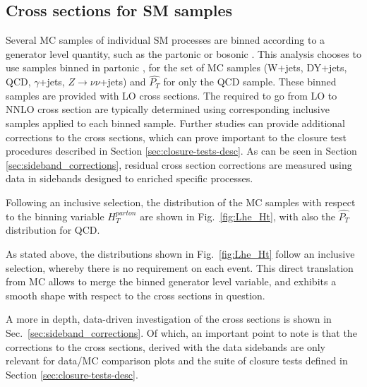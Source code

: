 \subsection{Cross sections for SM samples}
Several MC samples of individual SM processes are binned according to a generator level quantity, such as the partonic \HT or bosonic \PT.
This analysis chooses to use samples binned in partonic \HT, for the set of MC samples (W+jets, DY+jets, QCD, $\gamma$+jets, $Z\rightarrow \nu\nu$+jets) and $\hat{P_{T}}$
for only the QCD sample.
These binned samples are provided with LO cross sections. The \kfactors required to go from LO to NNLO cross section are typically determined using corresponding
inclusive samples applied to each \HT binned sample.
Further studies can provide additional corrections to the cross sections, which can prove important to the closure test procedures described in
Section \ref{sec:closure-tests-desc}. As can be seen in Section \ref{sec:sideband_corrections}, residual cross section
corrections are measured using data in sidebands designed to enriched specific processes.

Following an inclusive selection, the distribution of the MC samples with respect to the binning variable $H_{T}^{parton}$ are shown in Fig.~\ref{fig:Lhe_Ht}, with
also the $\hat{P_{T}}$ distribution for QCD.

As stated above, the distributions shown in Fig.~\ref{fig:Lhe_Ht} follow an inclusive selection, whereby there is no requirement on each event. This direct translation
from MC allows to merge the binned generator level variable, and exhibits a smooth shape with respect to the cross sections in question.

A more in depth, data-driven investigation of the cross sections is shown in Sec.~\ref{sec:sideband_corrections}. Of which, an important point to note is that
the corrections to the cross sections, derived with the data sidebands are only relevant for data/MC comparison plots and the suite of closure tests defined in Section \ref{sec:closure-tests-desc}.

